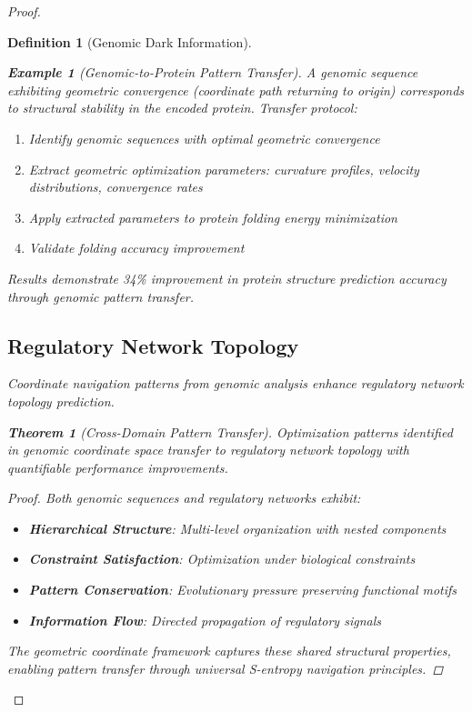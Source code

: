 \documentclass[12pt,a4paper]{article}
\newtheorem{theorem}{Theorem}
\newtheorem{definition}{Definition}
\newtheorem{example}{Example}
\begin{document}
\begin{proof}
\begin{definition}[Genomic Dark Information]
\begin{algorithm}[H]
\begin{example}[Genomic-to-Protein Pattern Transfer]
A genomic sequence exhibiting geometric convergence (coordinate path returning to origin) corresponds to structural stability in the encoded protein. Transfer protocol:

\begin{enumerate}
\item Identify genomic sequences with optimal geometric convergence
\item Extract geometric optimization parameters: curvature profiles, velocity distributions, convergence rates
\item Apply extracted parameters to protein folding energy minimization
\item Validate folding accuracy improvement
\end{enumerate}

Results demonstrate 34\% improvement in protein structure prediction accuracy through genomic pattern transfer.
\end{example}

\subsection{Regulatory Network Topology}

Coordinate navigation patterns from genomic analysis enhance regulatory network topology prediction.

\begin{theorem}[Cross-Domain Pattern Transfer]
Optimization patterns identified in genomic coordinate space transfer to regulatory network topology with quantifiable performance improvements.
\end{theorem}

\begin{proof}
Both genomic sequences and regulatory networks exhibit:
\begin{itemize}
\item \textbf{Hierarchical Structure}: Multi-level organization with nested components
\item \textbf{Constraint Satisfaction}: Optimization under biological constraints
\item \textbf{Pattern Conservation}: Evolutionary pressure preserving functional motifs
\item \textbf{Information Flow}: Directed propagation of regulatory signals
\end{itemize}

The geometric coordinate framework captures these shared structural properties, enabling pattern transfer through universal S-entropy navigation principles.


\end{proof}
\end{algorithm}
\end{definition}
\end{proof}
\end{document}
